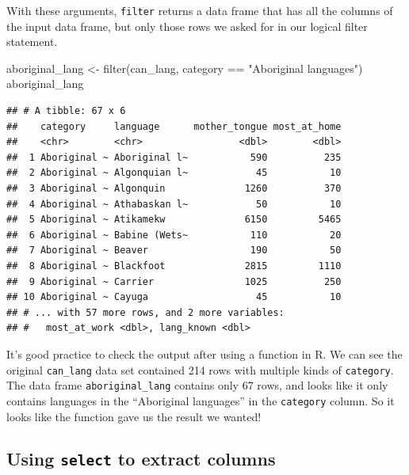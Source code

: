 \documentclass[
  12pt,
]{krantz}
\newenvironment{Shaded}{\begin{snugshade}}{\end{snugshade}}
\newcommand{\FunctionTok}[1]{\textcolor[rgb]{0,0,0}{#1}}
\newcommand{\NormalTok}[1]{#1}
\newcommand{\OtherTok}[1]{\textcolor[rgb]{0.37,0.37,0.37}{#1}}
\newcommand{\SpecialCharTok}[1]{\textcolor[rgb]{0,0,0}{#1}}
\newcommand{\StringTok}[1]{\textcolor[rgb]{0.5,0.5,0.5}{#1}}
\begin{document}
With these arguments, \texttt{filter} returns a data frame that has all the columns of
the input data frame, but only those rows we asked for in our logical filter
statement.

\begin{Shaded}
\begin{Highlighting}[]
\NormalTok{aboriginal\_lang }\OtherTok{\textless{}{-}} \FunctionTok{filter}\NormalTok{(can\_lang, category }\SpecialCharTok{==} \StringTok{"Aboriginal languages"}\NormalTok{)}
\NormalTok{aboriginal\_lang}
\end{Highlighting}
\end{Shaded}

\begin{verbatim}
## # A tibble: 67 x 6
##    category     language      mother_tongue most_at_home
##    <chr>        <chr>                 <dbl>        <dbl>
##  1 Aboriginal ~ Aboriginal l~           590          235
##  2 Aboriginal ~ Algonquian l~            45           10
##  3 Aboriginal ~ Algonquin              1260          370
##  4 Aboriginal ~ Athabaskan l~            50           10
##  5 Aboriginal ~ Atikamekw              6150         5465
##  6 Aboriginal ~ Babine (Wets~           110           20
##  7 Aboriginal ~ Beaver                  190           50
##  8 Aboriginal ~ Blackfoot              2815         1110
##  9 Aboriginal ~ Carrier                1025          250
## 10 Aboriginal ~ Cayuga                   45           10
## # ... with 57 more rows, and 2 more variables:
## #   most_at_work <dbl>, lang_known <dbl>
\end{verbatim}

It's good practice to check the output after using a
function in R. We can see the original \texttt{can\_lang} data set contained 214 rows
with multiple kinds of \texttt{category}. The data frame
\texttt{aboriginal\_lang} contains only 67 rows, and looks like it only contains languages in
the ``Aboriginal languages'' in the \texttt{category} column. So it looks like the function
gave us the result we wanted!

\hypertarget{using-select-to-extract-columns}{%
\subsection{\texorpdfstring{Using \texttt{select} to extract columns}{Using select to extract columns}}\label{using-select-to-extract-columns}}
\end{document}
